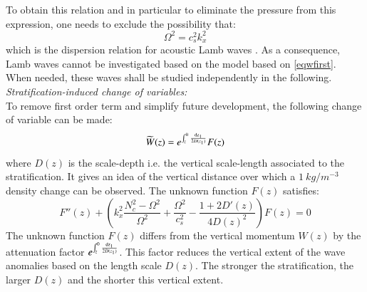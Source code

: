 \documentclass[a4paper,11pt]{article}
\begin{document}
To obtain this relation and in particular to eliminate the pressure from this expression, one needs to exclude the possibility that:
\begin{equation}
    \displaystyle
   \Omega^2 =  c_s^2k_x^2 
   \label{lamb0}
\end{equation}
which is the dispersion relation for acoustic Lamb waves \citep{apel_principles_1987}. As a consequence, Lamb waves cannot be investigated based on the model based on \ref{eqwfirst}. When needed, these waves shall be studied independently in the following.\\

\textit{Stratification-induced change of variables:}\\
To remove first order term and simplify future development, the following change of variable can be made:
\begin{equation}
  \displaystyle
  \widetilde{W}(z)=e^{\int_{z}^0{ \frac{\rm{d} z_1}{2D(z_1)} } }F(z)
  \label{CVF}
\end{equation}
where $D(z)$ is the scale-depth i.e. the vertical scale-length associated to the stratification. It gives an idea of the vertical distance over which a $1\ kg/m^{-3}$ density change can be observed.
The unknown function $F(z)$ satisfies:
\begin{equation}
  \displaystyle
  F''(z)
  +\left(
  k_x^2\frac{N_c^2-\Omega^2}{\Omega^2}
  +
  \frac{\Omega^2}{c_s^2}-\frac{1+2D'(z)}{4D(z)^2}
  \right)
  F(z)=0
  \label{eqF}
\end{equation}
The unknown function $F(z)$ differs from the vertical momentum $W(z)$ by the attenuation factor $e^{\int_{z}^0{ \frac{\rm{d} z_1}{2D(z_1)} } }$. This factor reduces the vertical extent of the wave anomalies based on the length scale $D(z)$. The stronger the stratification, the larger $D(z)$ and the shorter this vertical extent.\\
\end{document}

